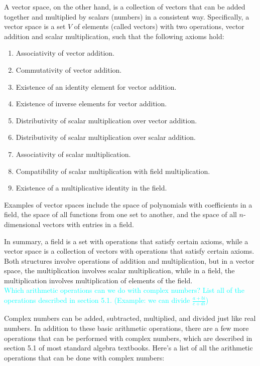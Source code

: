 \documentclass[fontsize=12pt]{scrartcl}
\begin{document}
\noindent
A vector space, on the other hand, is a collection of vectors that can be added together and multiplied by scalars (numbers) in a consistent way. Specifically, a vector space is a set $V$ of elements (called vectors) with two operations, vector addition and scalar multiplication, such that the following axioms hold:

\begin{enumerate}
	\item Associativity of vector addition.
	\item Commutativity of vector addition.
	\item Existence of an identity element for vector addition.
	\item Existence of inverse elements for vector addition.
	\item Distributivity of scalar multiplication over vector addition.
	\item Distributivity of scalar multiplication over scalar addition.
	\item Associativity of scalar multiplication.
	\item Compatibility of scalar multiplication with field multiplication.
	\item Existence of a multiplicative identity in the field.
\end{enumerate}

\noindent
Examples of vector spaces include the space of polynomials with coefficients in a field, the space of all functions from one set to another, and the space of all $n$-dimensional vectors with entries in a field.

\noindent
In summary, a field is a set with operations that satisfy certain axioms, while a vector space is a collection of vectors with operations that satisfy certain axioms. Both structures involve operations of addition and multiplication, but in a vector space, the multiplication involves scalar multiplication, while in a field, the multiplication involves multiplication of elements of the field.
\\

\noindent
\textcolor{cyan}{Which arithmetic operations can we do with complex numbers? List all of the operations described in section 5.1. (Example: we can divide $\displaystyle{\frac{a+bi}{c+di}}$)}

\noindent
Complex numbers can be added, subtracted, multiplied, and divided just like real numbers. In addition to these basic arithmetic operations, there are a few more operations that can be performed with complex numbers, which are described in section 5.1 of most standard algebra textbooks. Here's a list of all the arithmetic operations that can be done with complex numbers:
\end{document}

